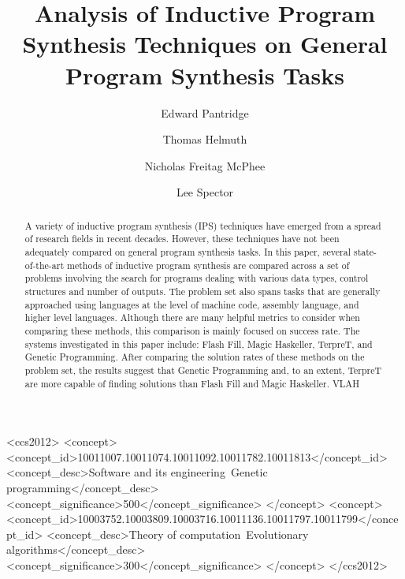 \documentclass[sigconf]{acmart}
\begin{document}
\title{Analysis of Inductive Program Synthesis Techniques on General Program Synthesis Tasks}

\author{Edward Pantridge}

\author{Thomas Helmuth}

\author{Nicholas Freitag McPhee}

\author{Lee Spector}


\begin{abstract}
	A variety of inductive program synthesis (IPS) techniques have emerged from a spread of research fields in recent decades. However, these techniques have not been adequately compared on general program synthesis tasks. In this paper, several state-of-the-art methods of inductive program synthesis are compared across a set of problems involving the search for programs dealing with various data types, control structures and number of outputs. The problem set also spans tasks that are generally approached using languages at the level of machine code, assembly language, and higher level languages. Although there are many helpful metrics to consider when comparing these methods, this comparison is mainly focused on success rate. The systems investigated in this paper include: Flash Fill, Magic Haskeller, TerpreT, and Genetic Programming. After comparing the solution rates of these methods on the problem set, the results suggest that Genetic Programming and, to an extent, TerpreT are more capable of finding solutions than Flash Fill and Magic Haskeller. VLAH
\end{abstract}

%
%
\begin{CCSXML}
<ccs2012>
<concept>
<concept_id>10011007.10011074.10011092.10011782.10011813</concept_id>
<concept_desc>Software and its engineering~Genetic programming</concept_desc>
<concept_significance>500</concept_significance>
</concept>
<concept>
<concept_id>10003752.10003809.10003716.10011136.10011797.10011799</concept_id>
<concept_desc>Theory of computation~Evolutionary algorithms</concept_desc>
<concept_significance>300</concept_significance>
</concept>
</ccs2012>
\end{CCSXML}
\end{document}
